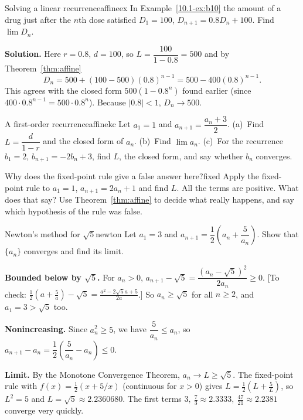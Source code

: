 \documentclass[11pt]{article}
\begin{document}
\begin{exmp}{Solving a linear recurrence}{affineex}
In Example~\ref{10.1-ex:b10} the amount of a drug just after the $n$th dose satisfied $D_1=100$, $D_{n+1}=0.8D_n+100$. Find $\lim D_n$.

\textbf{Solution.} Here $r=0.8$, $d=100$, so $L=\dfrac{100}{1-0.8}=500$ and by Theorem~\ref{thm:affine}
\[
D_n=500+(100-500)(0.8)^{n-1}=500-400(0.8)^{n-1}.
\]
This agrees with the closed form $500(1-0.8^n)$ found earlier (since $400\cdot0.8^{n-1}=500\cdot0.8^n$). Because $|0.8|<1$, $D_n\to500$.
\end{exmp}

\begin{kc}{A first-order recurrence}{affinekc}
Let $a_1=1$ and $a_{n+1}=\dfrac{a_n+3}{2}$. (a)~Find $L=\dfrac d{1-r}$ and the closed form of $a_n$. (b)~Find $\lim a_n$. (c)~For the recurrence $b_1=2$, $b_{n+1}=-2b_n+3$, find $L$, the closed form, and say whether $b_n$ converges.
\end{kc}

\begin{think}{Why does the fixed-point rule give a false answer here?}{fixed}
Apply the fixed-point rule to $a_1=1$, $a_{n+1}=2a_n+1$ and find $L$. All the terms are positive. What does that say? Use Theorem~\ref{thm:affine} to decide what really happens, and say which hypothesis of the rule was false.
\end{think}

\begin{exmp}{Newton's method for $\sqrt5$}{newton}
Let $a_1=3$ and $a_{n+1}=\dfrac12\left(a_n+\dfrac5{a_n}\right)$. Show that $\{a_n\}$ converges and find its limit.

\textbf{Bounded below by $\sqrt5$.} For $a_n>0$, $a_{n+1}-\sqrt5=\dfrac{(a_n-\sqrt5)^2}{2a_n}\ge0$. [To check: $\frac12\left(a+\frac5a\right)-\sqrt5=\frac{a^2-2\sqrt5a+5}{2a}$.]
So $a_n\ge\sqrt5$ for all $n\ge2$, and $a_1=3>\sqrt5$ too.

\textbf{Nonincreasing.} Since $a_n^2\ge5$, we have $\dfrac5{a_n}\le a_n$, so $a_{n+1}-a_n=\dfrac12\left(\dfrac5{a_n}-a_n\right)\le0$.

\textbf{Limit.} By the Monotone Convergence Theorem, $a_n\to L\ge\sqrt5$. The fixed-point rule with $f(x)=\frac12(x+5/x)$ (continuous for $x>0$) gives $L=\frac12(L+\frac5L)$, so $L^2=5$ and $L=\sqrt5\approx2.2360680$. The first terms $3,\ \frac73\approx2.3333,\ \frac{47}{21}\approx2.2381$ converge very quickly.
\end{exmp}
\end{document}
